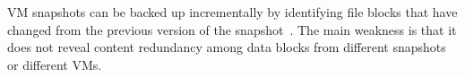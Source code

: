 VM snapshots can be  backed up  incrementally by identifying file  blocks that have
changed from the previous version of the snapshot~\cite{Clements2009,Vrable2009,TanIPDPS2011}.
The main weakness
is that it does not reveal content redundancy among data blocks from different snapshots or
different VMs.
 

